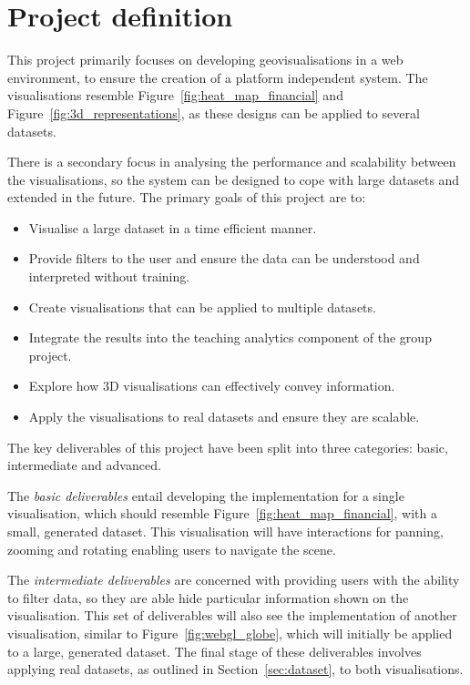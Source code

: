 \section{Project definition} {
\label{sec:project_definition}

	This project primarily focuses on developing geovisualisations in a web environment, to ensure the creation of a platform independent system. The visualisations resemble Figure~\ref{fig:heat_map_financial} and Figure~\ref{fig:3d_representations}, as these designs can be applied to several datasets.

	

	There is a secondary focus in analysing the performance and scalability between the visualisations, so the system can be designed to cope with large datasets and extended in the future. The primary goals of this project are to:

	\begin{itemize}
		\item Visualise a large dataset in a time efficient manner.
		\item Provide filters to the user and ensure the data can be understood and interpreted without training.
		\item Create visualisations that can be applied to multiple datasets.
		\item Integrate the results into the teaching analytics component of the group project.
		\item Explore how 3D visualisations can effectively convey information.
		\item Apply the visualisations to real datasets and ensure they are scalable.
	\end{itemize}

	The key deliverables of this project have been split into three categories: basic, intermediate and advanced.

	The \emph{basic deliverables} entail developing the implementation for a single visualisation, which should resemble Figure~\ref{fig:heat_map_financial}, with a small, generated dataset. This visualisation will have interactions for panning, zooming and rotating enabling users to navigate the scene.

	The \emph{intermediate deliverables} are concerned with providing users with the ability to filter data, so they are able hide particular information shown on the visualisation. This set of deliverables will also see the implementation of another visualisation, similar to Figure~\ref{fig:webgl_globe}, which will initially be applied to a large, generated dataset. The final stage of these deliverables involves applying real datasets, as outlined in Section~\ref{sec:dataset}, to both visualisations.

}
